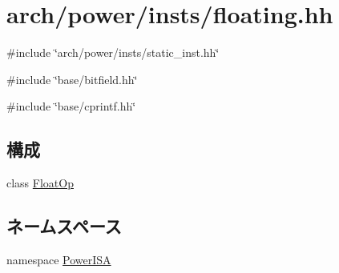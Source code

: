 \hypertarget{floating_8hh}{
\section{arch/power/insts/floating.hh}
\label{floating_8hh}
}
{\ttfamily \#include \char`\"{}arch/power/insts/static\_\-inst.hh\char`\"{}}\par
{\ttfamily \#include \char`\"{}base/bitfield.hh\char`\"{}}\par
{\ttfamily \#include \char`\"{}base/cprintf.hh\char`\"{}}\par
\subsection*{構成}
\begin{DoxyCompactItemize}
\item 
class \hyperlink{classPowerISA_1_1FloatOp}{FloatOp}
\end{DoxyCompactItemize}
\subsection*{ネームスペース}
\begin{DoxyCompactItemize}
\item 
namespace \hyperlink{namespacePowerISA}{PowerISA}
\end{DoxyCompactItemize}

